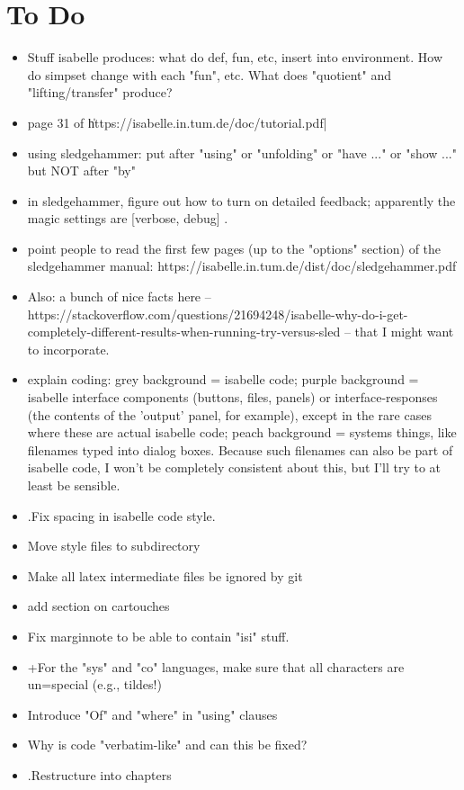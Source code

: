 \chapter*{To Do}
\begin{itemize}
\item 
Stuff isabelle produces: what do def, fun, etc, insert into environment. How do simpset change with each "fun", etc. What does "quotient" and "lifting/transfer" produce? 
\item page 31 of \|https://isabelle.in.tum.de/doc/tutorial.pdf|
\item using sledgehammer: put after "using" or "unfolding" or "have ..." or "show ..." but NOT after "by"
\item in sledgehammer, figure out how to turn on detailed feedback; apparently the magic settings are [verbose, debug] .
\item point people to read the first few pages (up to the "options" section) of the sledgehammer manual: https://isabelle.in.tum.de/dist/doc/sledgehammer.pdf
\item Also: a bunch of nice facts here -- https://stackoverflow.com/questions/21694248/isabelle-why-do-i-get-completely-different-results-when-running-try-versus-sled -- that I might want to incorporate. 
\item explain coding: grey background = isabelle code; purple background = isabelle interface components (buttons, files, panels) or interface-responses (the contents of the 'output' panel, for example), except in the rare cases where these are actual isabelle code; peach background = systems things, like filenames typed into dialog boxes. Because such filenames can also be part of isabelle code, I won't be completely consistent about this, but I'll try to at least be sensible.
\item .Fix spacing in isabelle code style.
\item Move style files to subdirectory
\item Make all latex intermediate files be ignored by git
\item add section on cartouches
\item Fix marginnote to be able to contain "isi" stuff.
\item +For the "sys" and "co" languages, make sure that all characters are un=special (e.g., tildes!)
\item Introduce "Of" and "where" in "using" clauses
\item Why is code "verbatim-like" and can this be fixed? 
\item .Restructure into chapters

\end{itemize}
